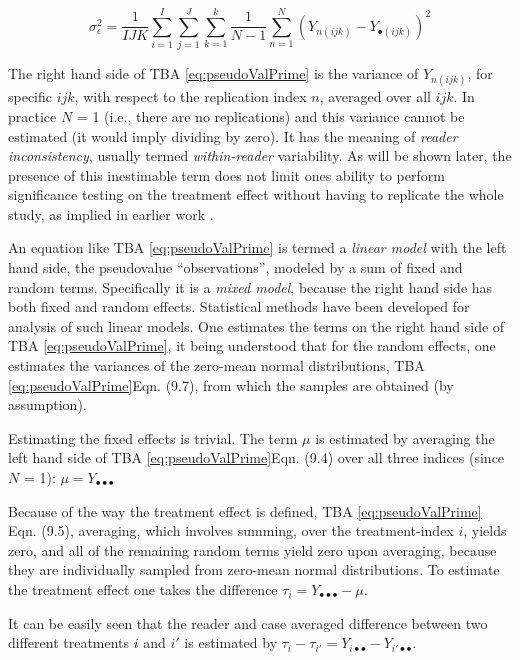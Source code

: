 \documentclass[
]{book}
\begin{document}
\begin{equation}
\sigma_{\epsilon}^{2}=\frac{1}{IJK}\sum_{i=1}^{I}\sum_{j=1}^{J}\sum_{k=1}^{k}\frac{1}{N-1}\sum_{n=1}^{N}\left ( Y_{n(ijk)} - Y_{\bullet (ijk)} \right )^2
\label{eq:EstimatingEpsilon}
\end{equation}

The right hand side of TBA \eqref{eq:pseudoValPrime} is the variance of \(Y_{n(ijk)}\), for specific \(ijk\), with respect to the replication index \(n\), averaged over all \(ijk\). In practice \(N\) = 1 (i.e., there are no replications) and this variance cannot be estimated (it would imply dividing by zero). It has the meaning of \emph{reader inconsistency}, usually termed \emph{within-reader} variability. As will be shown later, the presence of this inestimable term does not limit ones ability to perform significance testing on the treatment effect without having to replicate the whole study, as implied in earlier work \citep{RN1450}.

An equation like TBA \eqref{eq:pseudoValPrime} is termed a \emph{linear model} with the left hand side, the pseudovalue ``observations'', modeled by a sum of fixed and random terms. Specifically it is a \emph{mixed model}, because the right hand side has both fixed and random effects. Statistical methods have been developed for analysis of such linear models. One estimates the terms on the right hand side of TBA \eqref{eq:pseudoValPrime}, it being understood that for the random effects, one estimates the variances of the zero-mean normal distributions, TBA \eqref{eq:pseudoValPrime}Eqn. (9.7), from which the samples are obtained (by assumption).

Estimating the fixed effects is trivial. The term \(\mu\) is estimated by averaging the left hand side of TBA \eqref{eq:pseudoValPrime}Eqn. (9.4) over all three indices (since \(N\) = 1): \(\mu=Y_{\bullet \bullet \bullet}\)

Because of the way the treatment effect is defined, TBA \eqref{eq:pseudoValPrime} Eqn. (9.5), averaging, which involves summing, over the treatment-index \(i\), yields zero, and all of the remaining random terms yield zero upon averaging, because they are individually sampled from zero-mean normal distributions. To estimate the treatment effect one takes the difference \(\tau_i=Y_{\bullet \bullet \bullet}-\mu\).

It can be easily seen that the reader and case averaged difference between two different treatments \(i\) and \(i'\) is estimated by \(\tau_i-\tau_{i'} = Y_{i \bullet \bullet} - Y_{i' \bullet \bullet}\).
\end{document}
